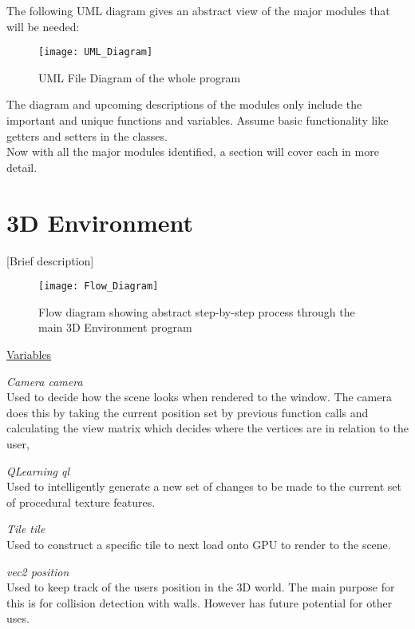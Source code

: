 \documentclass{report}
\begin{document}
The following UML diagram gives an abstract view of the major modules that will be needed:

\vspace{0.8cm}

\begin{figure}
\centerline{\texttt{[image: UML\_Diagram]}}
\caption[UML File Diagram]{}
\label{fgr:umld}
\centerline{UML File Diagram of the whole program}
\end{figure}

The diagram and upcoming descriptions of the modules only include the important and unique functions and variables. Assume basic functionality like
getters and setters in the classes.\\

Now with all the major modules identified, a section will cover each in more detail.

\section{3D Environment}
[Brief description]

\vspace{0.8cm}

\begin{figure}
\centerline{\texttt{[image: Flow\_Diagram]}}
\caption[System Flow Diagram]{}
\centerline{Flow diagram showing abstract step-by-step process through the main 3D Environment program}
\end{figure}

\vspace{0.8cm}

\noindent\underline{Variables}

\textit{Camera camera}\\
Used to decide how the scene looks when rendered to the window. The camera does this by taking the current position set by previous function calls 
and calculating the view matrix which decides where the vertices are in relation to the user,

\textit{QLearning ql}\\
Used to intelligently generate a new set of changes to be made to the current set of procedural texture features.

\textit{Tile tile}\\
Used to construct a specific tile to next load onto GPU to render to the scene.

\textit{vec2 position}\\
Used to keep track of the users position in the 3D world. The main purpose for this is for collision detection with walls. However has future potential
for other uses.
\end{document}
